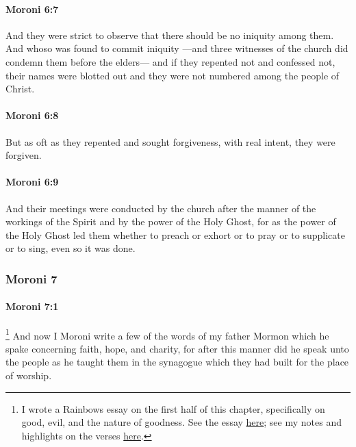 		\paragraph{Moroni 6:7} %
			\label{MORONI-6-7}

			And they were strict to observe
			that there should be no iniquity among them.
			And whoso was found to commit iniquity
			---and three witnesses of the church did condemn them before the elders---
			and if they repented not and confessed not,
			their names were blotted out
			and they were not numbered among the people of Christ.

		\paragraph{Moroni 6:8} %
			\label{MORONI-6-8}

			But as oft as they repented
			and sought forgiveness, with real intent,
			they were forgiven.

		\paragraph{Moroni 6:9} %
			\label{MORONI-6-9}

			And their meetings were conducted by the church
			after the manner of the workings of the Spirit
			and by the power of the Holy Ghost,
			for as the power of the Holy Ghost led them
			whether to preach or exhort or to pray or to supplicate or to sing,
			even so it was done.
			
	\subsubsection{Moroni 7}
		\label{MORONI-7}
		
		\paragraph{Moroni 7:1} %
			\label{MORONI-7-1}

				\footnote{%
					I wrote a Rainbows essay on the first half of this chapter, specifically on good, evil, and the nature of goodness. See the essay \href{https://climbingtherainbows.substack.com/p/beyond-good-and-evil-moroni-7}{here}; see my notes and highlights on the verses \href{https://drive.google.com/file/d/18uvmRJJHHrGCU1zLhzW073D9pMnyZ8Ws/view?usp=drive_link}{here}.
					}%
			And now I Moroni write a few of the words of my father Mormon
			which he spake concerning faith, hope, and charity,
			for after this manner did he speak unto the people
			as he taught them in the synagogue
			which they had built for the place of worship.


